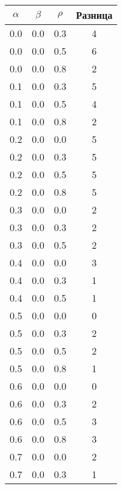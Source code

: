 \begin{longtable}[c]{|c|c|c|c|}
        \hline
        $\alpha$ & $\beta$ & $\rho$ & Разница \\ \hline
        \endhead
        0.0      & 0.0     & 0.3    & 4       \\ \hline
        0.0      & 0.0     & 0.5    & 6       \\ \hline
        0.0      & 0.0     & 0.8    & 2       \\ \hline
        0.1      & 0.0     & 0.3    & 5       \\ \hline
        0.1      & 0.0     & 0.5    & 4       \\ \hline
        0.1      & 0.0     & 0.8    & 2       \\ \hline
        0.2      & 0.0     & 0.0    & 5       \\ \hline
        0.2      & 0.0     & 0.3    & 5       \\ \hline
        0.2      & 0.0     & 0.5    & 5       \\ \hline
        0.2      & 0.0     & 0.8    & 5       \\ \hline
        0.3      & 0.0     & 0.0    & 2       \\ \hline
        0.3      & 0.0     & 0.3    & 2       \\ \hline
        0.3      & 0.0     & 0.5    & 2       \\ \hline
        0.4      & 0.0     & 0.0    & 3       \\ \hline
        0.4      & 0.0     & 0.3    & 1       \\ \hline
        0.4      & 0.0     & 0.5    & 1       \\ \hline
        0.5      & 0.0     & 0.0    & 0       \\ \hline
        0.5      & 0.0     & 0.3    & 2       \\ \hline
        0.5      & 0.0     & 0.5    & 2       \\ \hline
        0.5      & 0.0     & 0.8    & 1       \\ \hline
        0.6      & 0.0     & 0.0    & 0       \\ \hline
        0.6      & 0.0     & 0.3    & 2       \\ \hline
        0.6      & 0.0     & 0.5    & 3       \\ \hline
        0.6      & 0.0     & 0.8    & 3       \\ \hline
        0.7      & 0.0     & 0.0    & 2       \\ \hline
        0.7      & 0.0     & 0.3    & 1       \\ \hline

\end{longtable}
